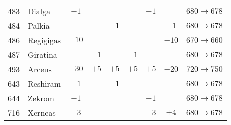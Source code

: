 \documentclass{article}
\begin{document}
\begin{longtable}{rl|cccccc|l}
\hline %
483 & Dialga & $-1$ &  &  &  & $-1$ &  & $680 \rightarrow 678$ \\
484 & Palkia &  &  & $-1$ &  &  & $-1$ & $680 \rightarrow 678$ \\
486 & Regigigas & $+10$ &  &  &  &  & $-10$ & $670 \rightarrow 660$ \\
487 & Giratina &  & $-1$ &  & $-1$ &  &  & $680 \rightarrow 678$ \\
493 & Arceus & $+30$ & $+5$ & $+5$ & $+5$ & $+5$ & $-20$ & $720 \rightarrow 750$ \\
\hline %
643 & Reshiram & $-1$ &  & $-1$ &  &  &  & $680 \rightarrow 678$ \\
644 & Zekrom & $-1$ &  &  &  & $-1$ &  & $680 \rightarrow 678$ \\
\hline %
716 & Xerneas & $-3$ &  &  &  & $-3$ & $+4$ & $680 \rightarrow 678$ \\

\end{longtable}
\end{document}
